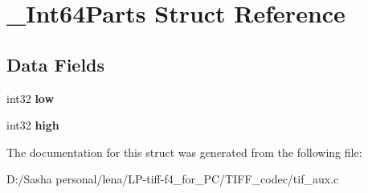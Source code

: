 \hypertarget{struct___int64_parts}{}\section{\+\_\+\+Int64\+Parts Struct Reference}
\label{struct___int64_parts}
\subsection*{Data Fields}
\begin{DoxyCompactItemize}
\item 
\hypertarget{struct___int64_parts_ad7212ac9161df917ee5b54093e460b3e}{}int32 {\bfseries low}\label{struct___int64_parts_ad7212ac9161df917ee5b54093e460b3e}

\item 
\hypertarget{struct___int64_parts_ae334d93165b593cf66cdc5def4e8fce5}{}int32 {\bfseries high}\label{struct___int64_parts_ae334d93165b593cf66cdc5def4e8fce5}

\end{DoxyCompactItemize}


The documentation for this struct was generated from the following file\+:\begin{DoxyCompactItemize}
\item 
D\+:/\+Sasha personal/lena/\+L\+P-\/tiff-\/f4\+\_\+for\+\_\+\+P\+C/\+T\+I\+F\+F\+\_\+codec/tif\+\_\+aux.\+c\end{DoxyCompactItemize}
